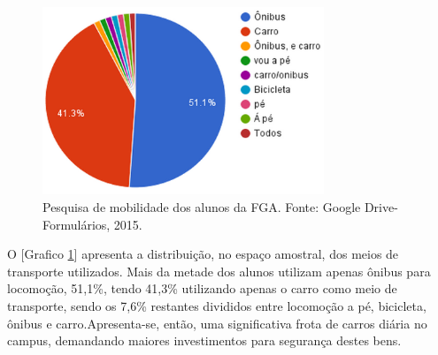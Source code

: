 \begin{figure}[H]
  \centering
  \includegraphics[width=0.75\textwidth]{figuras/pesquisa}
  \caption{Pesquisa de mobilidade dos alunos da FGA. Fonte: Google Drive-Formulários, 2015.}
  \label{img:pesquisa}
\end{figure}
 
O [Grafico \ref{img:pesquisa}] apresenta a distribuição, no espaço amostral, dos meios  de transporte utilizados. Mais da metade dos alunos utilizam apenas ônibus para locomoção, 51,1\%, tendo 41,3\% utilizando apenas o carro como meio de transporte, sendo os 7,6\% restantes divididos entre locomoção a pé, bicicleta, ônibus e carro.Apresenta-se, então, uma significativa frota de carros diária no campus, demandando maiores investimentos para segurança destes bens. 

